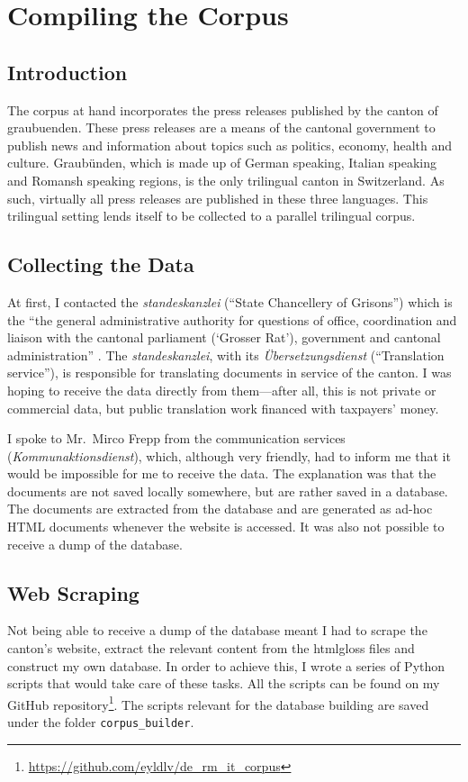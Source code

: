 \chapter{Compiling the Corpus}
\label{chap:compiling}
\section{Introduction}

The corpus at hand incorporates the press releases published by the canton of \Gls{graubuenden}. 
These press releases are a means of the cantonal government to publish news and information about topics such as politics, economy, health and culture. 
Graubünden, which is made up of German speaking, Italian speaking and Romansh speaking regions, is the only trilingual canton in Switzerland. 
As such, virtually all press releases are published in these three languages.
This trilingual setting lends itself to be collected to a parallel trilingual corpus.

\section{Collecting the Data}
At first, I contacted the \emph{\Gls{standeskanzlei}} (\enquote{State Chancellery of Grisons}) which is the \enquote{the general administrative authority for questions of office, coordination and liaison with the cantonal parliament (\enquote{Grosser Rat}), government and cantonal administration} \autocite{staka}. 
The \emph{\Gls{standeskanzlei}}, with its \emph{Übersetzungsdienst} (\enquote{Translation service}), is responsible for translating documents in service of the canton.
I was hoping to receive the data directly from them---after all, this is not private or commercial data, but  public translation work financed with taxpayers' money.

I spoke to Mr.~Mirco Frepp from the communication services (\emph{Kommunaktionsdienst}), which, although very friendly, had to inform me that it would be impossible for me to receive the data. 
The explanation was that the documents are not saved locally somewhere, but are rather saved in a database. 
The documents are extracted from the database and are generated as ad-hoc HTML documents whenever the website is accessed. 
It was also not possible to receive a dump of the database.

\section{Web Scraping}
Not being able to receive a dump of the database meant I had to scrape the canton's website, extract the relevant content from the \gls{htmlgloss} files and construct my own database. In order to achieve this, I wrote a series of Python scripts that would take care of these tasks. 
All the scripts can be found on my GitHub repository\footnote{\url{https://github.com/eyldlv/de_rm_it_corpus}}. 
The scripts relevant for the database building are saved under the folder \texttt{corpus\_builder}.

